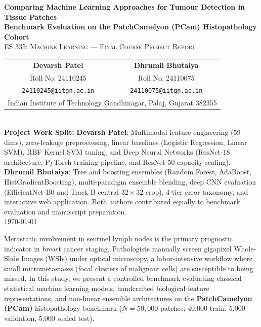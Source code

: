\documentclass[11pt,a4paper]{article}
\begin{document}
\begin{titlepage}
\begin{center}
    \vspace*{0.8cm}
    {\huge \textbf{\textcolor{primaryblue}{Comparing Machine Learning Approaches for Tumour Detection in Tissue Patches}}}\\[0.8em]
    {\Large \textbf{Benchmark Evaluation on the PatchCamelyon (PCam) Histopathology Cohort}}\\[0.4em]
    {\large \textsc{ES 335: Machine Learning --- Final Course Project Report}}\\[1.2em]
    
    \begin{tabular}{c c}
        \textbf{Devarsh Patel} & \textbf{Dhrumil Bhutaiya} \\
        Roll No: 24110245 & Roll No: 24110075 \\
        \texttt{24110245@iitgn.ac.in} & \texttt{24110075@iitgn.ac.in} \\[0.4em]
        \multicolumn{2}{c}{Indian Institute of Technology Gandhinagar, Palaj, Gujarat 382355}
    \end{tabular}\\[0.8em]
    {\footnotesize \textbf{Project Work Split:} \textbf{Devarsh Patel}: Multimodal feature engineering (59 dims), zero-leakage preprocessing, linear baselines (Logistic Regression, Linear SVM), RBF Kernel SVM tuning, and Deep Neural Networks (ResNet-18 architecture, PyTorch training pipeline, and ResNet-50 capacity scaling). \textbf{Dhrumil Bhutaiya}: Tree and boosting ensembles (Random Forest, AdaBoost, HistGradientBoosting), multi-paradigm ensemble blending, deep CNN evaluation (EfficientNet-B0 and Track B central $32 \times 32$ crop), 4-tier error taxonomy, and interactive web application. Both authors contributed equally to benchmark evaluation and manuscript preparation.}\\[0.8em]
    
    \today
    \vspace{0.8cm}
    
    \begin{tcolorbox}[colback=boxbg,colframe=boxborder,title=\textbf{Executive Summary \& Abstract},fonttitle=\bfseries\color{primaryblue},width=0.96\textwidth]
    \small
    Metastatic involvement in sentinel lymph nodes is the primary prognostic indicator in breast cancer staging. Pathologists manually screen gigapixel Whole-Slide Images (WSIs) under optical microscopy, a labor-intensive workflow where small micrometastases (focal clusters of malignant cells) are susceptible to being missed. In this study, we present a controlled benchmark evaluating classical statistical machine learning models, handcrafted biological feature representations, and non-linear ensemble architectures on the \textbf{PatchCamelyon (PCam)} histopathology benchmark ($N=50,000$ patches; 40,000 train, 5,000 validation, 5,000 sealed test).
    

\end{tcolorbox}
\end{center}
\end{titlepage}
\end{document}
